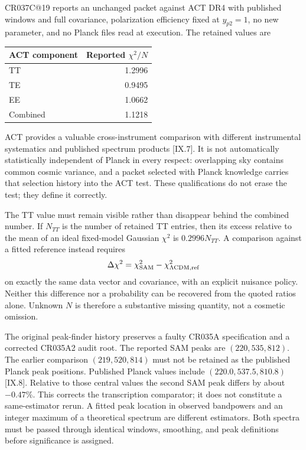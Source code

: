 CR037C@19 reports an unchanged packet against ACT DR4 with published windows and full covariance, polarization efficiency fixed at $y_{p2}=1$, no new parameter, and no Planck files read at execution. The retained values are
\begin{center}
\begin{tabular}{lr}
\toprule
ACT component & Reported $\chi^2/N$\\
\midrule
TT&1.2996\\
TE&0.9495\\
EE&1.0662\\
Combined&1.1218\\
\bottomrule
\end{tabular}
\end{center}
ACT provides a valuable cross-instrument comparison with different instrumental systematics and published spectrum products [IX.7]. It is not automatically statistically independent of Planck in every respect: overlapping sky contains common cosmic variance, and a packet selected with Planck knowledge carries that selection history into the ACT test. These qualifications do not erase the test; they define it correctly.

The TT value must remain visible rather than disappear behind the combined number. If $N_{TT}$ is the number of retained TT entries, then its excess relative to the mean of an ideal fixed-model Gaussian $\chi^2$ is $0.2996N_{TT}$. A comparison against a fitted reference instead requires
\begin{equation}
 \Delta\chi^2=\chi^2_{\rm SAM}-\chi^2_{\Lambda{\rm CDM},{\rm ref}}
 \label{c9:deltachi}
\end{equation}
on exactly the same data vector and covariance, with an explicit nuisance policy. Neither this difference nor a probability can be recovered from the quoted ratios alone. Unknown $N$ is therefore a substantive missing quantity, not a cosmetic omission.

The original peak-finder history preserves a faulty CR035A specification and a corrected CR035A2 audit root. The reported SAM peaks are $(220,535,812)$. The earlier comparison $(219,520,814)$ must not be retained as the published Planck peak positions. Published Planck values include $(220.0,537.5,810.8)$ [IX.8]. Relative to those central values the second SAM peak differs by about $-0.47\%$. This corrects the transcription comparator; it does not constitute a same-estimator rerun. A fitted peak location in observed bandpowers and an integer maximum of a theoretical spectrum are different estimators. Both spectra must be passed through identical windows, smoothing, and peak definitions before significance is assigned.

